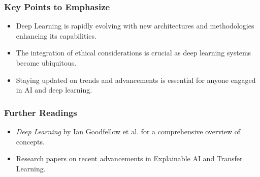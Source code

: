 \documentclass{beamer}
\begin{document}
\begin{frame}[fragile]
    \frametitle{Key Points to Emphasize}
    \begin{itemize}
        \item Deep Learning is rapidly evolving with new architectures and methodologies enhancing its capabilities.
        \item The integration of ethical considerations is crucial as deep learning systems become ubiquitous.
        \item Staying updated on trends and advancements is essential for anyone engaged in AI and deep learning.
    \end{itemize}
\end{frame}

\begin{frame}[fragile]
    \frametitle{Further Readings}
    \begin{itemize}
        \item \textit{Deep Learning} by Ian Goodfellow et al. for a comprehensive overview of concepts.
        \item Research papers on recent advancements in Explainable AI and Transfer Learning.
    \end{itemize}
\end{frame}
\end{document}
